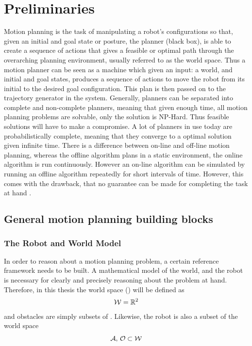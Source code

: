\chapter{Preliminaries}

Motion planning is the task of manipulating a robot's configurations so that,
given an initial and goal state or posture, the planner (black box), is able to
create a sequence of actions that gives a feasible or optimal path through the
overarching planning environment, usually referred to as the world space. Thus a
motion planner can be seen as a machine which given an input: a world, and
initial and goal states, produces a sequence of actions to move the robot from
its initial to the desired goal configuration. This plan is then passed on to
the trajectory generator in the system. Generally, planners can be separated
into complete and non-complete planners, meaning that given enough time, all
motion planning problems are solvable, only the solution is NP-Hard. Thus
feasible solutions will have to make a compromise. A lot of planners in use
today are probabilistically complete, meaning that they converge to a optimal
solution given infinite time. There is a difference between on-line and off-line
motion planning, whereas the offline algorithm plans in a static environment,
the online algorithm is run continuously. However an on-line algorithm can be
simulated by running an offline algorithm repeatedly for short intervals of
time. However, this comes with the drawback, that no guarantee can be made for
completing the task at hand \cite{Lav06}.


\section{General motion planning building blocks}

\subsection{The Robot and World Model}

In order to reason about a motion planning problem, a certain reference
framework needs to be built. A mathematical model of the world, and the robot is
necessary for clearly and precisely reasoning about the problem at hand.
Therefore, in this thesis the world space (\modelworld) will be defined as
\[
  \mathcal{W} = \mathbb{R}^2
\]
and obstacles are simply subsets of \modelworld. Likewise, the robot is also a
subset of the world space
\[
  \mathcal{A},\, \mathcal{O} \subset \mathcal{W}
\]

